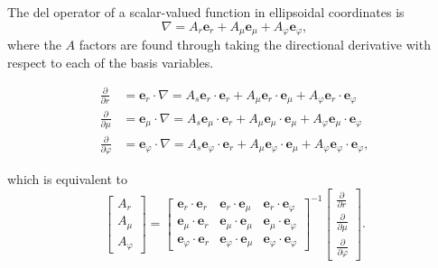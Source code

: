 The del operator of a scalar-valued function in ellipsoidal coordinates is
\begin{equation}
    \nabla = A_r \mathbf{e}_r + A_\mu \mathbf{e}_\mu + A_\varphi \mathbf{e}_\varphi,
    \label{eqn:gradient_evectors}
\end{equation}
where the $A$ factors are found through taking the directional derivative with respect to each of the basis variables.

\begin{subequations}
    \begin{align}
        \frac{\partial}{\partial r} &= \mathbf{e}_r \cdot \nabla = A_s \mathbf{e}_r \cdot \mathbf{e}_r + A_\mu \mathbf{e}_r \cdot \mathbf{e}_\mu + A_\varphi \mathbf{e}_r \cdot \mathbf{e}_\varphi \\
        \frac{\partial}{\partial \mu} &= \mathbf{e}_\mu \cdot \nabla = A_s \mathbf{e}_\mu \cdot \mathbf{e}_r + A_\mu \mathbf{e}_\mu \cdot \mathbf{e}_\mu + A_\varphi \mathbf{e}_\mu \cdot \mathbf{e}_\varphi \\
        \frac{\partial}{\partial \varphi} &= \mathbf{e}_\varphi \cdot \nabla = A_s \mathbf{e}_\varphi \cdot \mathbf{e}_r + A_\mu \mathbf{e}_\varphi \cdot \mathbf{e}_\mu + A_\varphi \mathbf{e}_\varphi \cdot \mathbf{e}_\varphi,
    \end{align}
\end{subequations}

which is equivalent to
\begin{equation}
    \begin{bmatrix}
        A_r \\ A_\mu \\ A_\varphi
    \end{bmatrix}
    =
    \begin{bmatrix}
        \mathbf{e}_r \cdot \mathbf{e}_r    & \mathbf{e}_r \cdot \mathbf{e}_\mu & \mathbf{e}_r \cdot \mathbf{e}_\varphi \\
        \mathbf{e}_\mu \cdot \mathbf{e}_r  & \mathbf{e}_\mu \cdot \mathbf{e}_\mu & \mathbf{e}_\mu \cdot \mathbf{e}_\varphi \\
        \mathbf{e}_\varphi \cdot \mathbf{e}_r & \mathbf{e}_\varphi \cdot \mathbf{e}_\mu & \mathbf{e}_\varphi \cdot \mathbf{e}_\varphi
    \end{bmatrix}^{-1}
    \begin{bmatrix}
        \frac{\partial}{\partial r} \\ \frac{\partial}{\partial \mu} \\ \frac{\partial}{\partial \varphi}
    \end{bmatrix}.
\end{equation}

